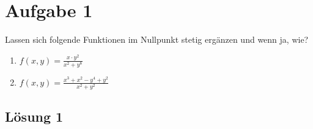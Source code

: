 \documentclass[main.tex]{subfiles}
\begin{document}
\section{Aufgabe 1}

Lassen sich folgende Funktionen im Nullpunkt stetig ergänzen und wenn ja, wie?

\begin{enumerate}
	\item $f(x,y) = \frac{x\cdot y^2}{x^2 + y^8}$
	\item $f(x,y) = \frac{x^3+x^2-y^4+y^2}{x^2+y^2}$
\end{enumerate}

\subsection{Lösung 1}
\end{document}
